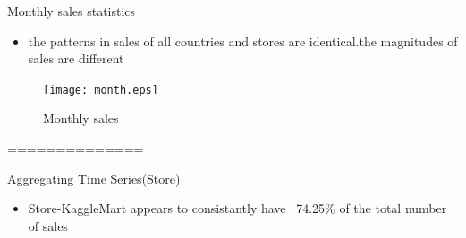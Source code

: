 \documentclass[
 size=14pt,
 paper=smartboard,  %
 mode=present, 		%
 display=slides, 	%
 style=tuliplab,  	%
 pauseslide,
 fleqn,leqno]{powerdot}
\begin{document}
\begin{slide}[toc=,bm=]{Monthly sales statistics}
\begin{itemize}
	\item
	the patterns in sales of all countries and stores are identical.the magnitudes of sales are different
\end{itemize}
\begin{figure}
  \centering
  \texttt{[image: month.eps]}
  \caption{Monthly sales}\label{fig:OutAspect-target}
\end{figure}
\end{slide}


==============
\begin{slide}[toc=,bm=]{Aggregating Time Series(Store)}
	
\begin{itemize}
	\bigskip
	\item
 	Store-KaggleMart appears to consistantly have ~74.25\% of the total number of sales
\end{itemize}
\bigskip
\begin{center}
\end{center}
\end{slide}
\end{document}
